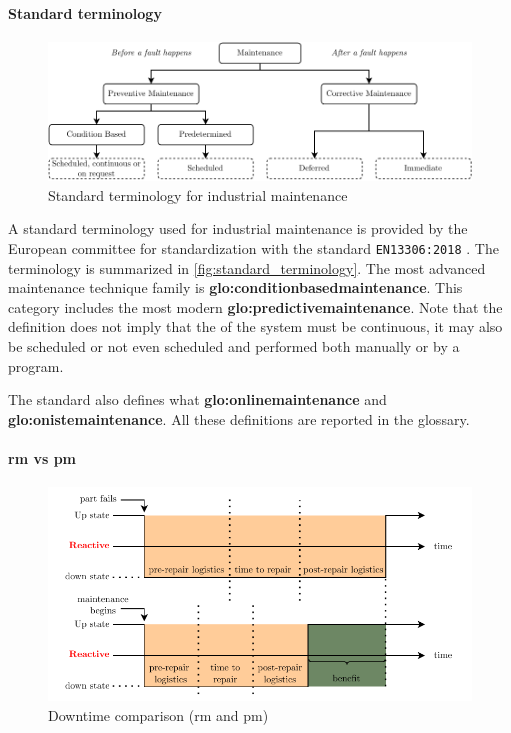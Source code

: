 \paragraph{Standard terminology}
\begin{figure}
    \centering
    \includegraphics[width=\textwidth]{images/StateArt/EN_classification.drawio.pdf}
    \caption{Standard terminology for industrial maintenance \cite{rastegari2017condition}}
    \label{fig:standard_terminology}
\end{figure}

A standard terminology used for industrial maintenance is provided by the European committee for standardization with the standard \texttt{EN13306:2018} \cite{EN13306:2018}. The terminology is summarized in \autoref{fig:standard_terminology}. The most advanced maintenance technique family is \textbf{\gls{glo:conditionbasedmaintenance}}. This category includes the most modern \textbf{\gls{glo:predictivemaintenance}}. Note that the definition does not imply that the  of the system must be continuous, it may also be scheduled or not even scheduled and performed both manually or by a program.

The standard also defines what \textbf{\gls{glo:onlinemaintenance}} and \textbf{\gls{glo:onistemaintenance}}. All these definitions are reported in the {glossary}.


\paragraph{\gls{rm} vs \gls{pm}}
\begin{figure}
    \centering
    \includegraphics[width=\textwidth]{images/StateArt/lost_opportunities.pdf}
    \caption{Downtime comparison (\gls{rm} and \gls{pm})}
    \label{fig:lost_opportunities}
\end{figure}

